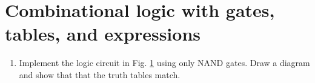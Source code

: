 \documentclass[10pt]{article}
\begin{document}
\section{Combinational logic with gates, tables, and expressions}
\begin{enumerate}
\begin{figure}
\centering
\texttt{[image: figures/MultiGate3.pdf]}
\caption{\label{fig:m3} A combinatorial logic circuit.}
\end{figure}
\item Implement the logic circuit in Fig. \ref{fig:m3} using only NAND gates. Draw a diagram and show that that the truth tables match. \\ \vspace{4cm}
\end{enumerate}
\end{document}
